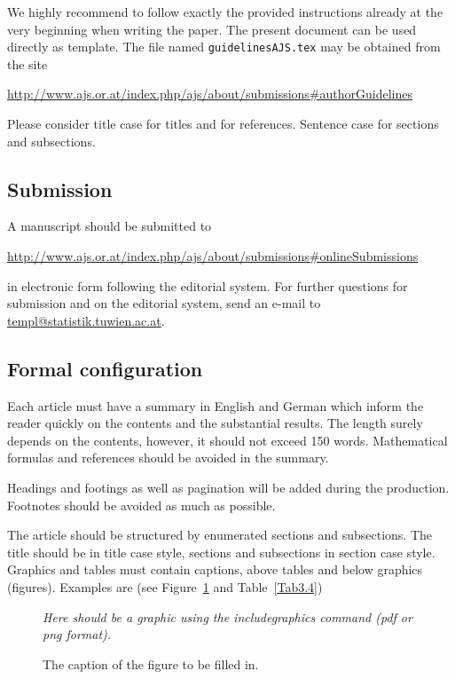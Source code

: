 \documentclass[article]{ajs}
\begin{document}
We highly recommend
to follow exactly the provided instructions already at the very
beginning when writing the paper. The present document can be used
directly as template. The file named {\tt guidelinesAJS.tex} may be
obtained from the site 

\href{http://www.ajs.or.at/index.php/ajs/about/submissions\#authorGuidelines}{http://www.ajs.or.at/index.php/ajs/about/submissions\#authorGuidelines}

Please consider title case for titles and for references. Sentence case for  sections and subsections.

\subsection{Submission}

A manuscript should be submitted to
\begin{center}
\href{http://www.ajs.or.at/index.php/ajs/about/submissions\#onlineSubmissions}{http://www.ajs.or.at/index.php/ajs/about/submissions\#onlineSubmissions}
\end{center}

in
electronic form following the editorial system. For further questions for submission and on the editorial system, send an e-mail to \href{templ@statistik.tuwien.ac.at}{templ@statistik.tuwien.ac.at}.


\subsection{Formal configuration}

Each article must have a summary in English and German which
inform the reader quickly on the contents and the substantial
results. The length surely depends on the contents, however, it
should not exceed 150 words. Mathematical formulas and references should be
avoided in the summary.

Headings and footings as well as pagination will be added during
the production. Footnotes should be avoided as much as possible.

The article should be structured by enumerated sections and
subsections. The title should be in title case style, sections and subsections in section case style. Graphics and tables must contain captions, above
tables and below graphics (figures). Examples are (see Figure~\ref{Fig3.4} and Table~\ref{Tab3.4})

\begin{figure}[!hbt]
\centerline{\sl Here should be a graphic using the includegraphics command (pdf or png format).}
\caption{\label{Fig3.4}The caption of the figure to be filled in.} 
\end{figure}
\end{document}
